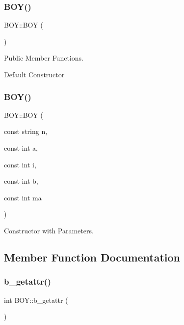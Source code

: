 \subsubsection{\texorpdfstring{B\+O\+Y()}{BOY()}\hspace{0.1cm}{\footnotesize\ttfamily [1/2]}}
{\footnotesize\ttfamily B\+O\+Y\+::\+B\+OY (\begin{DoxyParamCaption}{ }\end{DoxyParamCaption})\hspace{0.3cm}{\ttfamily [inline]}}



Public Member Functions. 

Default Constructor \mbox{\label{class_b_o_y_adef7f2ff9935938ad36a7bc801126eff}} 
\subsubsection{\texorpdfstring{B\+O\+Y()}{BOY()}\hspace{0.1cm}{\footnotesize\ttfamily [2/2]}}
{\footnotesize\ttfamily B\+O\+Y\+::\+B\+OY (\begin{DoxyParamCaption}\item[{const string}]{n,  }\item[{const int}]{a,  }\item[{const int}]{i,  }\item[{const int}]{b,  }\item[{const int}]{ma }\end{DoxyParamCaption})}



Constructor with Parameters. 



\subsection{Member Function Documentation}
\mbox{\label{class_b_o_y_a711c3c4753c474b002d2b0d01d3a4ea3}} 
\subsubsection{\texorpdfstring{b\+\_\+getattr()}{b\_getattr()}}
{\footnotesize\ttfamily int B\+O\+Y\+::b\+\_\+getattr (\begin{DoxyParamCaption}{ }\end{DoxyParamCaption})}



